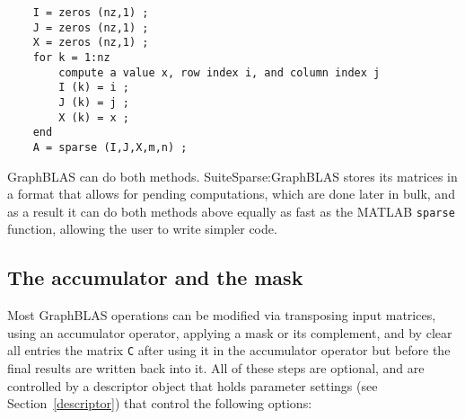 \documentclass[12pt]{article}
\begin{document}
    \begin{mdframed}
    {\footnotesize
    \begin{verbatim}
    I = zeros (nz,1) ;
    J = zeros (nz,1) ;
    X = zeros (nz,1) ;
    for k = 1:nz
        compute a value x, row index i, and column index j
        I (k) = i ;
        J (k) = j ;
        X (k) = x ;
    end
    A = sparse (I,J,X,m,n) ;   \end{verbatim}} \end{mdframed}

GraphBLAS can do both methods.  SuiteSparse:GraphBLAS stores its matrices in a
format that allows for pending computations, which are done later in bulk, and
as a result it can do both methods above equally as fast as the MATLAB
\verb'sparse' function, allowing the user to write simpler code.

\subsection{The accumulator and the mask} %
\label{accummask}

Most GraphBLAS operations can be modified via transposing input matrices, using
an accumulator operator, applying a mask or its complement, and by clear all
entries the matrix \verb'C' after using it in the accumulator operator but
before the final results are written back into it.  All of these steps are
optional, and are controlled by a descriptor object that holds parameter
settings (see Section~\ref{descriptor}) that control the following options:
\end{document}
